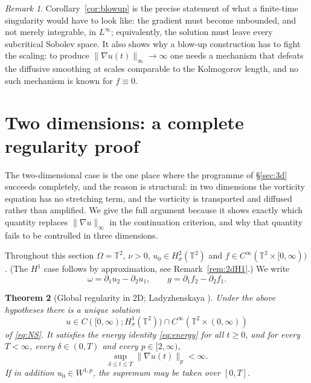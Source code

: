 \documentclass[11pt]{article}
\newtheorem{theorem}{Theorem}[section]
\theoremstyle{remark}
\newtheorem{remark}[theorem]{Remark}
\newcommand{\T}{\mathbb{T}}
\newcommand{\norm}[1]{\lVert #1\rVert}
\begin{document}
\begin{remark}\label{rem:BKMmeaning}
Corollary~\ref{cor:blowup} is the precise statement of what a finite-time singularity would
have to look like: the gradient must become unbounded, and not merely integrable, in
$L^\infty$; equivalently, the solution must leave every subcritical Sobolev space. It also
shows why a blow-up construction has to fight the scaling: to produce
$\norm{\nabla u(t)}_\infty\to\infty$ one needs a mechanism that defeats the diffusive
smoothing at scales comparable to the Kolmogorov length, and no such mechanism is known for
$f\equiv0$.
\end{remark}

\section{Two dimensions: a complete regularity proof}\label{sec:2d}

The two-dimensional case is the one place where the programme of
\S\ref{sec:3d} succeeds completely, and the reason is structural: in two dimensions the
vorticity equation has no stretching term, and the vorticity is transported and diffused
rather than amplified. We give the full argument because it shows exactly which quantity
replaces $\norm{\nabla u}_\infty$ in the continuation criterion, and why that quantity fails
to be controlled in three dimensions.

Throughout this section $\Omega=\T^2$, $\nu>0$, $u_0\in H^2_\sigma(\T^2)$ and
$f\in C^\infty(\T^2\times[0,\infty))$. (The $H^1$ case follows by approximation, see
Remark~\ref{rem:2dH1}.) We write
\[
\omega=\partial_1u_2-\partial_2u_1,\qquad g=\partial_1f_2-\partial_2f_1 .
\]

\begin{theorem}[Global regularity in 2D; Ladyzhenskaya {\rm\cite{Ladyzhenskaya1969}}]
\label{thm:2d}
Under the above hypotheses there is a unique solution
\[
u\in C([0,\infty);H^1_\sigma(\T^2))\cap C^\infty(\T^2\times(0,\infty))
\]
of \eqref{eq:NS}. It satisfies the energy identity \eqref{eq:energy} for all $t\ge0$, and for
every $T<\infty$, every $\delta\in(0,T)$ and every $p\in[2,\infty)$,
\begin{equation}\label{eq:2dbound}
\sup_{\delta\le t\le T}\norm{\nabla u(t)}_{p}<\infty .
\end{equation}
If in addition $u_0\in W^{1,p}$, the supremum may be taken over $[0,T]$.
\end{theorem}
\end{document}
